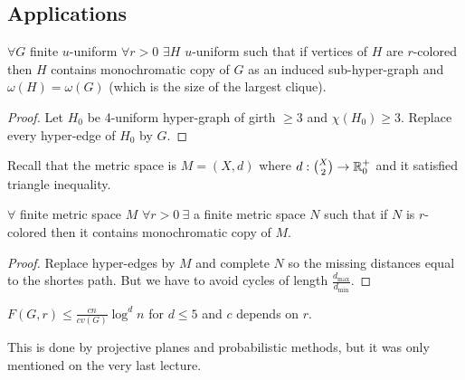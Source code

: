 \subsection{Applications}

\begin{thm}[Folkman]
	$\forall G$ finite $u$-uniform $\forall r > 0$ $\exists H$ $u$-uniform such that if vertices of $H$ are $r$-colored then $H$ contains monochromatic copy of $G$ as an induced sub-hyper-graph and $\omega(H) = \omega(G)$ (which is the size of the largest clique).
\end{thm}

\begin{proof}
	Let $H_0$ be 4-uniform hyper-graph of girth $\geq 3$ and $\chi(H_0) \geq 3$. Replace every hyper-edge of $H_0$ by $G$.
\end{proof}

\begin{defn}
	Recall that the metric space is $M = (X, d)$ where $d : \binom{X}{2} \to \mathbb{R}^+_0$ and it satisfied triangle inequality.
\end{defn}

\begin{thm}
	$\forall$ finite metric space $M$ $\forall r > 0 \ \exists$ a finite metric space $N$ such that if $N$ is $r$-colored then it contains monochromatic copy of $M$.
\end{thm}

\begin{proof}
	Replace hyper-edges by $M$ and complete $N$ so the missing distances equal to the shortes path. But we have to avoid cycles of length $\frac{d_{\max}}{d_{\min}}$.
\end{proof}

\begin{thm}
	$F(G,r) \leq \frac{cn}{cv(G)} \log^d n$ for $d \leq 5$ and $c$ depends on $r$.
\end{thm}

This is done by projective planes and probabilistic methods, but it was only mentioned on the very last lecture.